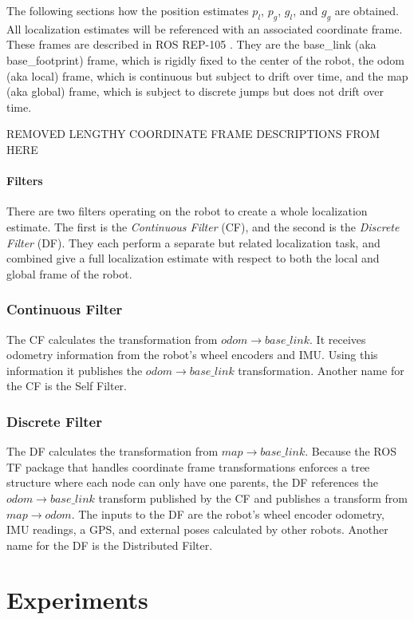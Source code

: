 \documentclass[conference]{IEEEtran}
\begin{document}
The following sections how the position estimates $p_l$, $p_g$, $g_l$, and $g_g$ are obtained. All localization estimates will be referenced with an associated coordinate frame. These frames are described in ROS REP-105 \cite{REP_105}. They are the base\_link (aka base\_footprint) frame, which is rigidly fixed to the center of the robot, the odom (aka local) frame, which is continuous but subject to drift over time, and the map (aka global) frame, which is subject to discrete jumps but does not drift over time.

REMOVED LENGTHY COORDINATE FRAME DESCRIPTIONS FROM HERE
 
\paragraph{Filters}
There are two filters operating on the robot to create a whole localization estimate. The first is the \textit{Continuous Filter} (CF), and the second is the \textit{Discrete Filter} (DF). They each perform a separate but related localization task, and combined give a full localization estimate with respect to both the local and global frame of the robot. 

\subsubsection{Continuous Filter} \label{con_filter_subsubsection}
The CF calculates the transformation from $odom \rightarrow base\_link$. It receives odometry information from the robot's wheel encoders and IMU. Using this information it publishes the $odom \rightarrow base\_link$ transformation. Another name for the CF is the Self Filter.  

\subsubsection{Discrete Filter} \label{disc_filter_subsubsection}
The DF calculates the transformation from $map \rightarrow base\_link$. Because the ROS TF package that handles coordinate frame transformations enforces a tree structure where each node can only have one parents, the DF references the $odom \rightarrow base\_link$ transform published by the CF and publishes a transform from $map \rightarrow odom$. The inputs to the DF are the robot's wheel encoder odometry, IMU readings, a GPS, and external poses calculated by other robots. Another name for the DF is the Distributed Filter.


\section{Experiments}
\end{document}
